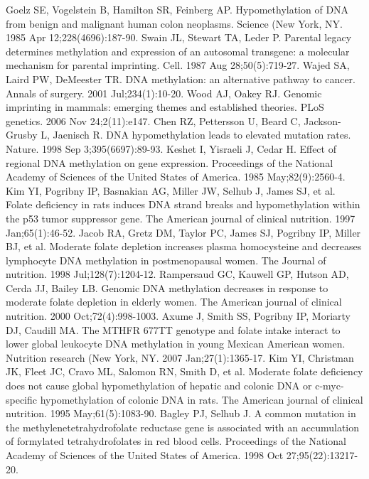 \begin{thebibliography}{12} 
		Goelz SE, Vogelstein B, Hamilton SR, Feinberg AP. Hypomethylation of DNA from benign and malignant human colon neoplasms. Science (New York, NY. 1985 Apr 12;228(4696):187-90. 
		Swain JL, Stewart TA, Leder P. Parental legacy determines methylation and expression of an autosomal transgene: a molecular mechanism for parental imprinting. Cell. 1987 Aug 28;50(5):719-27. 
		Wajed SA, Laird PW, DeMeester TR. DNA methylation: an alternative pathway to cancer. Annals of surgery. 2001 Jul;234(1):10-20. 
		Wood AJ, Oakey RJ. Genomic imprinting in mammals: emerging themes and established theories. PLoS genetics. 2006 Nov 24;2(11):e147. 
		Chen RZ, Pettersson U, Beard C, Jackson-Grusby L, Jaenisch R. DNA hypomethylation leads to elevated mutation rates. Nature. 1998 Sep 3;395(6697):89-93. 
		Keshet I, Yisraeli J, Cedar H. Effect of regional DNA methylation on gene expression. Proceedings of the National Academy of Sciences of the United States of America. 1985 May;82(9):2560-4. 
		Kim YI, Pogribny IP, Basnakian AG, Miller JW, Selhub J, James SJ, et al. Folate deficiency in rats induces DNA strand breaks and hypomethylation within the p53 tumor suppressor gene. The American journal of clinical nutrition. 1997 Jan;65(1):46-52. 
		Jacob RA, Gretz DM, Taylor PC, James SJ, Pogribny IP, Miller BJ, et al. Moderate folate depletion increases plasma homocysteine and decreases lymphocyte DNA methylation in postmenopausal women. The Journal of nutrition. 1998 Jul;128(7):1204-12. 
		Rampersaud GC, Kauwell GP, Hutson AD, Cerda JJ, Bailey LB. Genomic DNA methylation decreases in response to moderate folate depletion in elderly women. The American journal of clinical nutrition. 2000 Oct;72(4):998-1003. 
		Axume J, Smith SS, Pogribny IP, Moriarty DJ, Caudill MA. The MTHFR 677TT genotype and folate intake interact to lower global leukocyte DNA methylation in young Mexican American women. Nutrition research (New York, NY. 2007 Jan;27(1):1365-17. 
		Kim YI, Christman JK, Fleet JC, Cravo ML, Salomon RN, Smith D, et al. Moderate folate deficiency does not cause global hypomethylation of hepatic and colonic DNA or c-myc-specific hypomethylation of colonic DNA in rats. The American journal of clinical nutrition. 1995 May;61(5):1083-90. 
		Bagley PJ, Selhub J. A common mutation in the methylenetetrahydrofolate reductase gene is associated with an accumulation of formylated tetrahydrofolates in red blood cells. Proceedings of the National Academy of Sciences of the United States of America. 1998 Oct 27;95(22):13217-20. 

\end{thebibliography}

